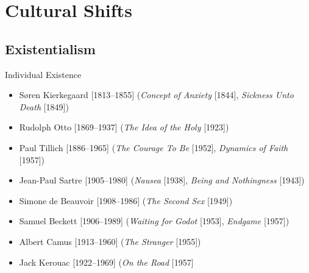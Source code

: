 \timeout

\section{Cultural Shifts}
\subsection{Existentialism}
\begin{frame}{Individual Existence}
	\begin{itemize}
		\item<+->S{\o}ren Kierkegaard [1813--1855] (\emph{Concept of Anxiety} [1844], \emph{Sickness Unto Death} [1849])
		\item<+->Rudolph Otto [1869--1937] (\emph{The Idea of the Holy} [1923])
		\item<+->Paul Tillich [1886--1965] (\emph{The Courage To Be} [1952], \emph{Dynamics of Faith} [1957])
		\item<+->Jean-Paul Sartre [1905--1980] (\emph{Nausea} [1938], \emph{Being and Nothingness} [1943])
		\item<+->Simone de Beauvoir [1908--1986] (\emph{The Second Sex} [1949])
		\item<+->Samuel Beckett [1906--1989] (\emph{Waiting for Godot} [1953], \emph{Endgame} [1957])
		\item<+->Albert Camus [1913--1960] (\emph{The Stranger} [1955])
		\item<+->Jack Kerouac [1922--1969] (\emph{On the Road} [1957]
	\end{itemize}

\end{frame}

